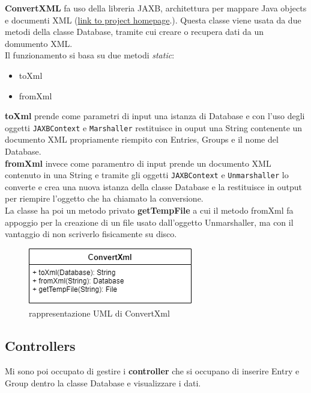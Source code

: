 \documentclass[a4paper,12pt]{report}
\begin{document}
\textbf{ConvertXML} fa uso della libreria JAXB, architettura per mappare Java objects e documenti XML
(\href{https://javaee.github.io/jaxb-v2/}{link to project homepage}.). Questa classe viene usata da due
metodi della classe Database, tramite cui creare o recupera dati da un domumento XML.\\

Il funzionamento si basa su due metodi \textit{static}:
\begin{itemize}
  \item toXml
  \item fromXml
\end{itemize}

\textbf{toXml} prende come parametri di input una istanza di Database e con l'uso degli oggetti
\texttt{JAXBContext} e \texttt{Marshaller} restituisce in ouput una String contenente un documento
XML propriamente riempito con Entries, Groups e il nome del Database.\\

\textbf{fromXml} invece come paramentro di input prende un documento XML contenuto in una String
e tramite gli oggetti \texttt{JAXBContext} e \texttt{Unmarshaller} lo converte e crea una nuova
istanza della classe Database e la restituisce in output per riempire l'oggetto che ha chiamato
la conversione.\\

La classe ha poi un metodo privato \textbf{getTempFile} a cui il metodo fromXml fa appoggio per
la creazione di un file usato dall'oggetto Unmarshaller, ma con il vantaggio di non scriverlo
fisicamente su disco.\\

\begin{figure}[h]
\centering{}
\includegraphics[scale=0.7]{ConvertXmlUml}
\caption{rappresentazione UML di ConvertXml}
\end{figure}
\clearpage

\subsection*{Controllers}

Mi sono poi occupato di gestire i \textbf{controller} che si occupano di inserire Entry e Group
dentro la classe Database e visualizzare i dati.\\
\end{document}
